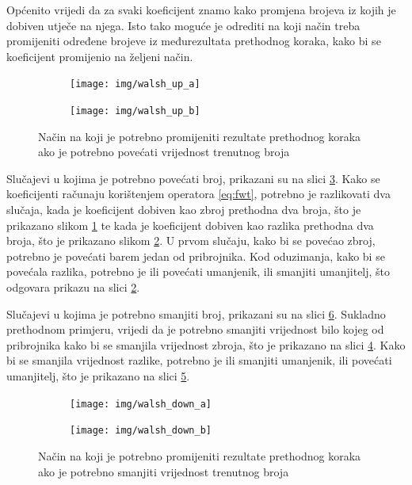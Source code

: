 Općenito vrijedi da za svaki koeficijent znamo kako promjena brojeva iz kojih je dobiven utječe na njega.
Isto tako moguće je odrediti na koji način treba promijeniti određene brojeve iz međurezultata prethodnog koraka, kako bi se koeficijent promijenio na željeni način.
\begin{figure}[th!]
    \centering
    \begin{subfigure}{.5\textwidth}
        \centering
        \texttt{[image: img/walsh\_up\_a]}
        \captionsetup{justification=centering}
        \caption{}
        \label{fig:walsh_up_a}
    \end{subfigure}%
    \begin{subfigure}{.5\textwidth}
        \centering
        \texttt{[image: img/walsh\_up\_b]}
        \captionsetup{justification=centering}
        \caption{}
        \label{fig:walsh_up_b}
    \end{subfigure}
    \caption{Način na koji je potrebno promijeniti rezultate prethodnog koraka ako je potrebno povećati vrijednost trenutnog broja}
    \label{fig:walsh_up}
\end{figure}
Slučajevi u kojima je potrebno povećati broj, prikazani su na slici \ref{fig:walsh_up}.
Kako se koeficijenti računaju korištenjem operatora \eqref{eq:fwt}, potrebno je razlikovati dva slučaja, kada je koeficijent dobiven kao zbroj prethodna dva broja, što je prikazano slikom \ref{fig:walsh_up_a} te kada je koeficijent dobiven kao razlika prethodna dva broja, što je prikazano slikom \ref{fig:walsh_up_b}.
U prvom slučaju, kako bi se povećao zbroj, potrebno je povećati barem jedan od pribrojnika.
Kod oduzimanja, kako bi se povećala razlika, potrebno je ili povećati umanjenik, ili smanjiti umanjitelj, što odgovara prikazu na slici \ref{fig:walsh_up_b}. 

Slučajevi u kojima je potrebno smanjiti broj, prikazani su na slici \ref{fig:walsh_down}.
Sukladno prethodnom primjeru, vrijedi da je potrebno smanjiti vrijednost bilo kojeg od pribrojnika kako bi se smanjila vrijednost zbroja, što je prikazano na slici \ref{fig:walsh_down_a}.
Kako bi se smanjila vrijednost razlike, potrebno je ili smanjiti umanjenik, ili povećati umanjitelj, što je prikazano na slici \ref{fig:walsh_down_b}.
\begin{figure}[th!]
    \centering
    \begin{subfigure}{.5\textwidth}
        \centering
        \texttt{[image: img/walsh\_down\_a]}
        \captionsetup{justification=centering}
        \caption{}
        \label{fig:walsh_down_a}
    \end{subfigure}%
    \begin{subfigure}{.5\textwidth}
        \centering
        \texttt{[image: img/walsh\_down\_b]}
        \captionsetup{justification=centering}
        \caption{}
        \label{fig:walsh_down_b}
    \end{subfigure}
    \caption{Način na koji je potrebno promijeniti rezultate prethodnog koraka ako je potrebno smanjiti vrijednost trenutnog broja}
    \label{fig:walsh_down}
\end{figure}

